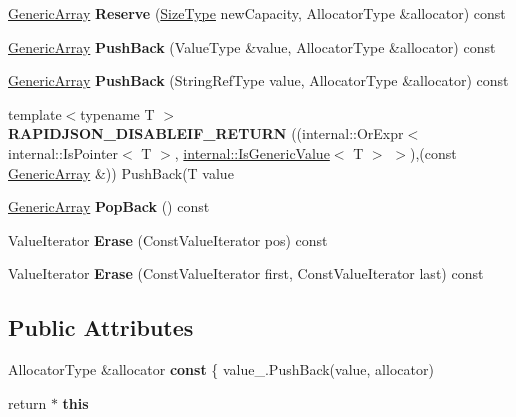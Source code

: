 \begin{DoxyCompactItemize}
\item 
\mbox{\label{class_generic_array_a7c74901e8e2174fe4661f4848995f355}} 
\hyperlink{class_generic_array}{Generic\+Array} {\bfseries Reserve} (\hyperlink{rapidjson_8h_a5ed6e6e67250fadbd041127e6386dcb5}{Size\+Type} new\+Capacity, Allocator\+Type \&allocator) const
\item 
\mbox{\label{class_generic_array_a2ed88f0630c044bad695a127a866c348}} 
\hyperlink{class_generic_array}{Generic\+Array} {\bfseries Push\+Back} (Value\+Type \&value, Allocator\+Type \&allocator) const
\item 
\mbox{\label{class_generic_array_ae599de6aee1167648085672b79dd6bcc}} 
\hyperlink{class_generic_array}{Generic\+Array} {\bfseries Push\+Back} (String\+Ref\+Type value, Allocator\+Type \&allocator) const
\item 
\mbox{\label{class_generic_array_a12adff0c1e11aa3be6f4160015a65df0}} 
{\footnotesize template$<$typename T $>$ }\\{\bfseries R\+A\+P\+I\+D\+J\+S\+O\+N\+\_\+\+D\+I\+S\+A\+B\+L\+E\+I\+F\+\_\+\+R\+E\+T\+U\+RN} ((internal\+::\+Or\+Expr$<$ internal\+::\+Is\+Pointer$<$ T $>$, \hyperlink{structinternal_1_1_is_generic_value}{internal\+::\+Is\+Generic\+Value}$<$ T $>$ $>$),(const \hyperlink{class_generic_array}{Generic\+Array} \&)) Push\+Back(T value
\item 
\mbox{\label{class_generic_array_afd1c75a82d2fc4366cde18256962edf6}} 
\hyperlink{class_generic_array}{Generic\+Array} {\bfseries Pop\+Back} () const
\item 
\mbox{\label{class_generic_array_aefa57a363accf2ade867583771f8a54b}} 
Value\+Iterator {\bfseries Erase} (Const\+Value\+Iterator pos) const
\item 
\mbox{\label{class_generic_array_ac1be0c701ad3aaf0570a8a1ffc715fd5}} 
Value\+Iterator {\bfseries Erase} (Const\+Value\+Iterator first, Const\+Value\+Iterator last) const
\end{DoxyCompactItemize}
\subsection*{Public Attributes}
\begin{DoxyCompactItemize}
\item 
\mbox{\label{class_generic_array_a25d2ed55daa117c41db6a5b3f87e9ddc}} 
Allocator\+Type \&allocator {\bfseries const} \{ value\+\_\+.\+Push\+Back(value, allocator)
\item 
\mbox{\label{class_generic_array_aef8b7baa9ec5cd68d8951fa8bad85217}} 
return $\ast$ {\bfseries this}
\end{DoxyCompactItemize}
